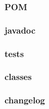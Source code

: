 \documentclass[12pt]{report}
\begin{document}
\subsubsection{POM}

\subsubsection{javadoc}

\subsubsection{tests}

\subsubsection{classes}

\subsubsection{changelog}
\end{document}
